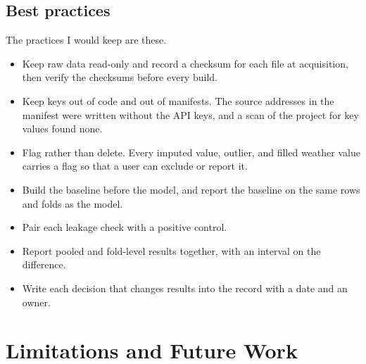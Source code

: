 \documentclass[10pt,journal,compsoc]{IEEEtran}
\begin{document}
\subsection{Best practices}
The practices I would keep are these.
\begin{itemize}
\item Keep raw data read-only and record a checksum for each file at acquisition, then verify the checksums before every build.
\item Keep keys out of code and out of manifests. The source addresses in the manifest were written without the API keys, and a scan of the project for key values found none.
\item Flag rather than delete. Every imputed value, outlier, and filled weather value carries a flag so that a user can exclude or report it.
\item Build the baseline before the model, and report the baseline on the same rows and folds as the model.
\item Pair each leakage check with a positive control.
\item Report pooled and fold-level results together, with an interval on the difference.
\item Write each decision that changes results into the record with a date and an owner.
\end{itemize}

\section{Limitations and Future Work}
\label{sec:limits}
\end{document}
